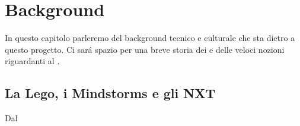 \chapter{Background}

In questo capitolo parleremo del background tecnico e culturale che sta
dietro a questo progetto. Ci sar\'a spazio per una breve storia dei \nxt{}
e delle veloci nozioni riguardanti al \PID{}.

\section{La Lego, i Mindstorms e gli NXT}
Dal

\cleardoublepage
